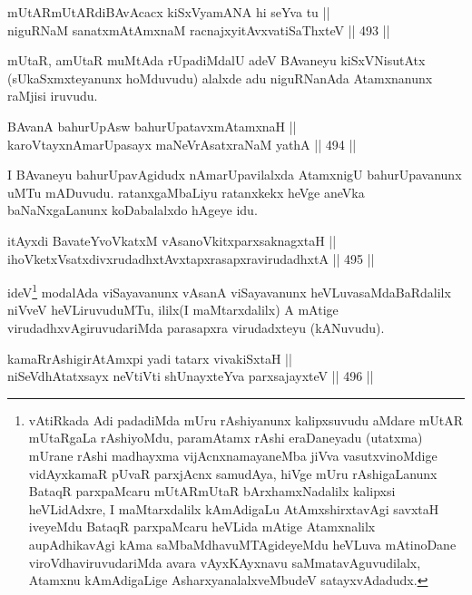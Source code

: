 \begin{shl}
mUtARmUtARdiBAvAcacx kiSxVyamANA hi seYva tu || \\
niguRNaM sanatxmAtAmxnaM racnajxyitAvx\s vatiSaThxteV \hfill || 493 ||  
\end{shl}

\begin{artha}
mUtaR, amUtaR muMtAda rUpadiMdalU adeV BAvaneyu kiSxVNisutAtx
(sUkaSxmxteyanunx hoMduvudu) alalxde adu niguRNanAda Atamxnanunx
raMjisi iruvudu.
\end{artha}

\begin{shl}
BAvanA bahurUpA\s sw bahurUpatavxmAtamxnaH || \\
karoVtayxnAmarUpasayx maNeVrAsatxraNaM yathA \hfill || 494 ||  
\end{shl}

\begin{artha}
I BAvaneyu bahurUpavAgidudx nAmarUpavilalxda AtamxnigU bahurUpavanunx
uMTu mADuvudu. ratanxgaMbaLiyu ratanxkekx heVge aneVka
baNaNxgaLanunx koDabalalxdo hAgeye idu.
\end{artha}


\begin{shl}
itAyxdi BavateYvoVkatxM vAsanoVkitxparxsaknagxtaH ||  \\
ihoVketxVsatxdivxrudadhxtAvxtapxrasapxravirudadhxtA \hfill || 495 ||  
\end{shl}

\begin{artha}
ideV\footnote{vAtiRkada Adi padadiMda mUru rAshiyanunx kalipxsuvudu
aMdare mUtAR mUtaRgaLa rAshiyoMdu, paramAtamx rAshi eraDaneyadu
(utatxma) mUrane rAshi madhayxma vijAcnxnamayaneMba jiVva
vasutxvinoMdige vidAyxkamaR pUvaR parxjAcnx samudAya, hiVge mUru
rAshigaLanunx BataqR parxpaMcaru mUtARmUtaR bArxhamxNadalilx
kalipxsi heVLidAdxre, I maMtarxdalilx kAmAdigaLu AtAmxshirxtavAgi
savxtaH iveyeMdu BataqR parxpaMcaru heVLida mAtige Atamxnalilx
aupAdhikavAgi kAma saMbaMdhavuMTAgideyeMdu heVLuva mAtinoDane
viroVdhaviruvudariMda avara vAyxKAyxnavu saMmatavAguvudilalx,
Atamxnu kAmAdigaLige AsharxyanalalxveMbudeV satayxvAdadudx.} modalAda viSayavanunx vAsanA viSayavanunx
heVLuvasaMdaBaRdalilx niVveV heVLiruvuduMTu, ililx\footnotemark[2](I maMtarxdalilx) A mAtige virudadhxvAgiruvudariMda parasapxra
virudadxteyu (kANuvudu).
\end{artha}

\begin{shl}
kamaRrAshigirA\s \s tAmx\s pi yadi tatarx vivakiSxtaH || \\
niSeVdhAtatxsayx neVtiVti shUnayxteYva parxsajayxteV \hfill || 496 ||  
\end{shl}

